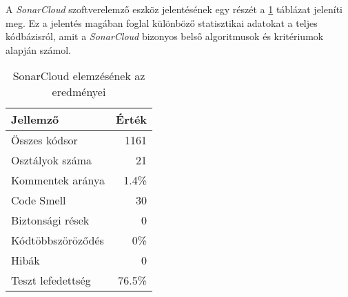 A \textit{SonarCloud} szoftverelemző eszköz jelentésének egy részét a \ref{tab:sonar} táblázat jeleníti meg. Ez a jelentés magában foglal különböző statisztikai adatokat a teljes kódbázisról, amit a \textit{SonarCloud} bizonyos belső algoritmusok és kritériumok alapján számol.

\begin{table}
    \centering
    \begin{tabular}{|l|r|}
    \hline
    Jellemző & Érték \\ \hline
    \hline
    Összes kódsor & 1161 \\ \hline
    Osztályok száma & 21 \\ \hline
    Kommentek aránya & 1.4\% \\ \hline
    Code Smell & 30 \\ \hline
    Biztonsági rések & 0 \\ \hline
    Kódtöbbszöröződés & 0\% \\ \hline
    Hibák & 0 \\ \hline
    Teszt lefedettség & 76.5\% \\ \hline
    \end{tabular}
    \caption{SonarCloud elemzésének az eredményei}
    \label{tab:sonar}
\end{table}

